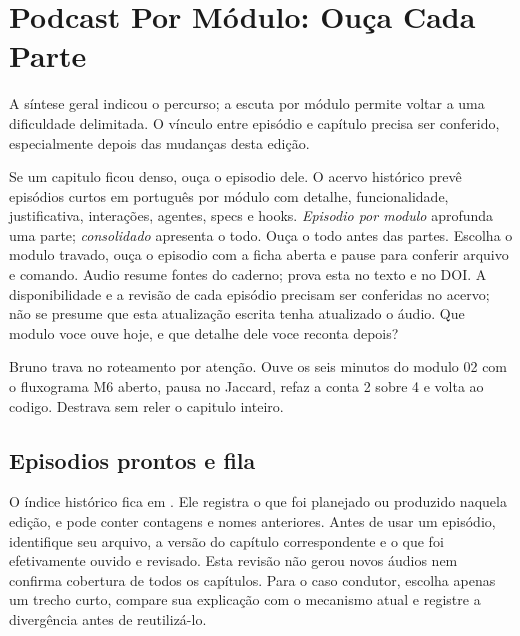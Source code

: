 \chapter{Podcast Por M\'odulo: Ou\c{c}a Cada Parte}

A síntese geral indicou o percurso; a escuta por módulo permite voltar a uma dificuldade delimitada. O vínculo entre episódio e capítulo precisa ser conferido, especialmente depois das mudanças desta edição.


\roteirodidatico
{Se um capitulo ficou denso, ou\c{c}a o episodio dele. O acervo histórico prevê episódios curtos em português por módulo com detalhe, funcionalidade, justificativa, intera\c{c}\~oes, agentes, specs e hooks.}
{\emph{Episodio por modulo} aprofunda uma parte; \emph{consolidado} apresenta o todo. Ou\c{c}a o todo antes das partes.}
{Escolha o modulo travado, ou\c{c}a o episodio com a ficha aberta e pause para conferir arquivo e comando.}
{Audio resume fontes do caderno; prova esta no texto e no DOI. A disponibilidade e a revisão de cada episódio precisam ser conferidas no acervo; não se presume que esta atualização escrita tenha atualizado o áudio.}
{Que modulo voce ouve hoje, e que detalhe dele voce reconta depois?}

{Bruno trava no roteamento por aten\c{c}\~ao. Ouve os seis minutos do modulo 02 com o fluxograma M6 aberto, pausa no Jaccard, refaz a conta 2 sobre 4 e volta ao codigo. Destrava sem reler o capitulo inteiro.}

\section{Episodios prontos e fila}


\begin{descricao}
O índice histórico fica em . Ele registra o que foi planejado ou produzido naquela edição, e pode conter contagens e nomes anteriores. Antes de usar um episódio, identifique seu arquivo, a versão do capítulo correspondente e o que foi efetivamente ouvido e revisado. Esta revisão não gerou novos áudios nem confirma cobertura de todos os capítulos. Para o caso condutor, escolha apenas um trecho curto, compare sua explicação com o mecanismo atual e registre a divergência antes de reutilizá-lo.
\end{descricao}

